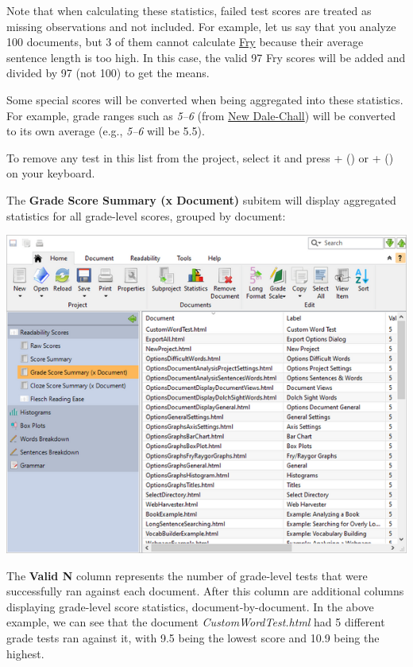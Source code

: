 \documentclass[
]{book}
\theoremstyle{definition}
\theoremstyle{definition}
\theoremstyle{definition}
\theoremstyle{definition}
\theoremstyle{remark}
\begin{document}
Note that when calculating these statistics, failed test scores are treated as missing observations and not included. For example, let us say that you analyze 100 documents, but 3 of them cannot calculate \protect\hyperlink{fry-test}{Fry} because their average sentence length is too high. In this case, the valid 97 Fry scores will be added and divided by 97 (not 100) to get the means.

Some special scores will be converted when being aggregated into these statistics. For example, grade ranges such as \emph{5--6} (from \protect\hyperlink{dale-chall-test}{New Dale-Chall}) will be converted to its own average (e.g., \emph{5--6} will be 5.5).

To remove any test in this list from the project, select it and press + (\faWindows) or \keys{\cmd}+\keys{\backdel} (\faApple) on your keyboard.

The \textbf{Grade Score Summary (x Document)} subitem will display aggregated statistics for all grade-level scores, grouped by document:

\includegraphics{Images/BatchGradeScoresByDocument.png}

The \textbf{Valid N} column represents the number of grade-level tests that were successfully ran against each document. After this column are additional columns displaying grade-level score statistics, document-by-document. In the above example, we can see that the document \emph{CustomWordTest.html} had 5 different grade tests ran against it, with 9.5 being the lowest score and 10.9 being the highest.
\end{document}
